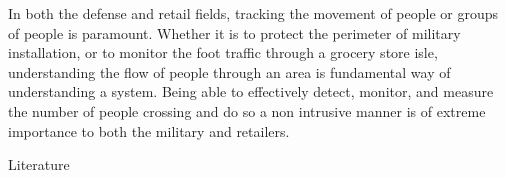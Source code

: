 



In both the defense and retail fields, tracking the movement of people or groups of people is paramount. Whether it is to protect the perimeter of military installation, or to monitor the foot traffic through a grocery store isle, understanding the flow of people through an area is fundamental way of understanding a system. Being able to effectively detect, monitor, and measure the number of people crossing and do so a non intrusive manner is of extreme importance to both the military and retailers.

Literature 
	






